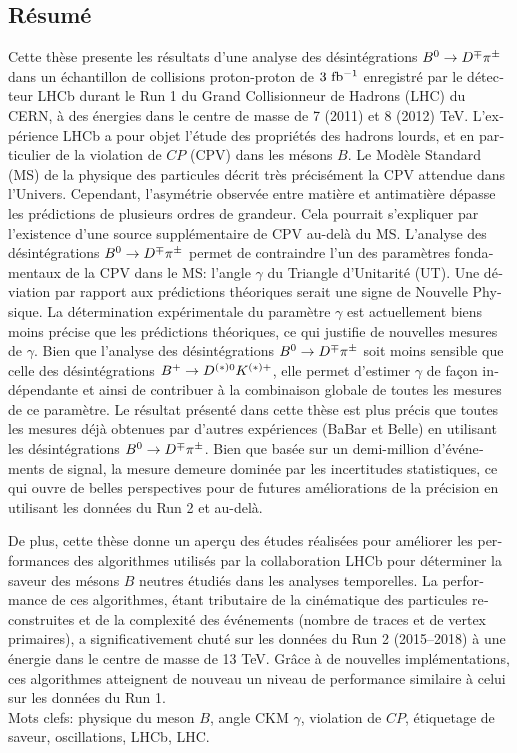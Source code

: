 \begin{otherlanguage}{french}
\cleardoublepage
\chapter*{Résumé}
\vskip0.2cm
Cette thèse presente les résultats d'une analyse des désintégrations $B^0\rightarrow D^\mp\pi^\pm$
dans un échantillon de collisions proton-proton de $3~\rm fb^{-1}$ enregistré par le détecteur LHCb 
durant le Run 1 du Grand Collisionneur de Hadrons (LHC)
du CERN, à des énergies dans le centre de masse de 7 (2011) et 8 (2012) TeV.
L'expérience LHCb a pour objet l'étude des propriétés des hadrons lourds, 
et en particulier de la violation de $CP$ (CPV) dans les mésons $B$.
Le Modèle Standard (MS) de la physique des particules décrit très précisément la CPV 
attendue dans l'Univers. Cependant, l'asymétrie observée entre matière et antimatière
dépasse les prédictions de plusieurs ordres de grandeur. Cela pourrait s'expliquer
par l'existence d'une source supplémentaire de CPV au-delà du MS.
L'analyse des désintégrations $B^0\rightarrow D^\mp\pi^\pm$ permet de contraindre l'un
des paramètres fondamentaux de la CPV dans le MS: l'angle $\gamma$ du Triangle d'Unitarité (UT).
Une déviation par rapport aux prédictions
théoriques serait une signe de Nouvelle Physique.
La détermination expérimentale du paramètre $\gamma$ est actuellement biens
moins précise que les prédictions théoriques, ce qui justifie de 
nouvelles mesures de $\gamma$.
Bien que l'analyse des désintégrations $B^0\rightarrow D^\mp\pi^\pm$ soit moins sensible que celle
des désintégrations $B^+\rightarrow D^{(*)0}K^{(*)+}$, elle permet d'estimer $\gamma$
de façon indépendante et ainsi de contribuer à la combinaison globale
de toutes les mesures de ce paramètre.
Le résultat présenté dans cette thèse est plus précis que toutes
les mesures déjà obtenues par d'autres expériences (BaBar et Belle) en
utilisant les désintégrations $B^0\rightarrow D^\mp\pi^\pm$.
Bien que basée sur un demi-million d'événements de signal,
la mesure demeure dominée par les incertitudes statistiques, ce qui ouvre de
belles perspectives pour de futures améliorations de la précision en utilisant
les données du Run 2 et au-delà.

De plus, cette thèse donne un aperçu des 
études réalisées pour améliorer les performances des algorithmes utilisés 
par la collaboration LHCb pour déterminer la saveur des mésons $B$ neutres
étudiés dans les analyses temporelles.
La performance de ces algorithmes, étant tributaire de la cinématique des particules reconstruites
et de la complexité des événements (nombre de traces et de vertex primaires), a
significativement chuté sur les données du Run 2 (2015--2018) 
à une énergie dans le centre de masse de 13 TeV. Gr\^ace à de nouvelles implémentations,
ces algorithmes atteignent de nouveau un niveau de performance similaire à
celui sur les données du Run 1. \\

Mots clefs: physique du meson $B$, angle CKM $\gamma$, violation de $CP$, étiquetage de saveur, oscillations, LHCb, LHC.
\end{otherlanguage}



